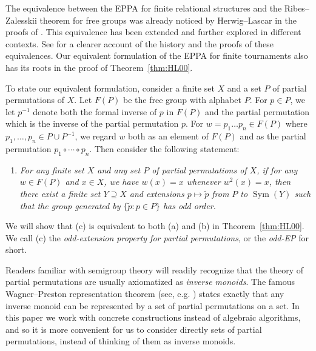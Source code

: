 \documentclass[10pt,a4paper]{amsart}
\theoremstyle{definition}
\theoremstyle{definition}
\numberwithin{equation}{section}
\begin{document}
The equivalence between the EPPA for finite relational structures and the Ribes--Zalesskii theorem for free groups was already noticed by Herwig--Lascar in the proofs of \cite{HL00}. This equivalence has been extended and further explored in different contexts. See \cite{ABO26} for a clearer account of the history and the proofs of these equivalences. Our equivalent formulation of the EPPA for finite tournaments also has its roots in the proof of Theorem~\ref{thm:HL00}.

To state our equivalent formulation, consider a finite set $X$ and a set $P$ of partial permutations of $X$. Let $F(P)$ be the free group with alphabet $P$. For $p\in P$, we let $p^{-1}$ denote both the formal inverse of $p$ in $F(P)$ and the partial permutation which is the inverse of the partial permutation $p$. For $w=p_1\dots p_n\in F(P)$ where $p_1,\dots, p_n\in P\cup P^{-1}$, we regard $w$ both as an element of $F(P)$ and as the partial permutation $p_1\circ\cdots\circ p_n$. Then consider the following statement:
\begin{enumerate}
\item[(c)] \emph{For any finite set $X$ and any set $P$ of partial permutations of $X$, if for any $w\in F(P)$ and $x\in X$, we have $w(x)=x$ whenever $w^2(x)=x$, then there exist a finite set $Y\supseteq X$ and extensions $p\mapsto \tilde{p}$ from $P$ to $\operatorname{Sym}(Y)$ such that the group generated by $\{\tilde{p}\colon p\in P\}$ has odd order. }
\end{enumerate}
We will show that (c) is equivalent to both (a) and (b) in Theorem~\ref{thm:HL00}. We call (c) the \emph{odd-extension property for partial permutations}, or the \emph{odd-EP} for short.

Readers familiar with semigroup theory will readily recognize that the theory of partial permutations are usually axiomatized as \emph{inverse monoids}. The famous Wagner--Preston representation theorem (see, e.g. \cite[Section 1.5]{La98}) states exactly that any inverse monoid can be represented by a set of partial permutations on a set. In this paper we work with concrete constructions instead of algebraic algorithms, and so it is more convenient for us to consider directly sets of partial permutations, instead of thinking of them as inverse monoids.
\end{document}
